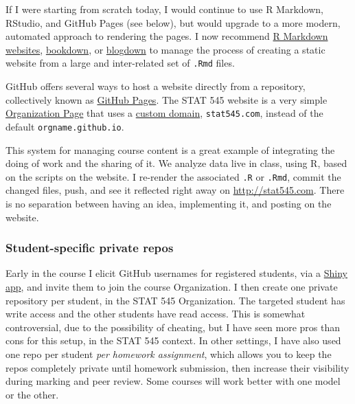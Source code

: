 \documentclass[12pt]{article}
\begin{document}
If I were starting from scratch today, I would continue to use R
Markdown, RStudio, and GitHub Pages (see below), but would upgrade to a
more modern, automated approach to rendering the pages. I now recommend
\href{http://rmarkdown.rstudio.com/rmarkdown_websites.html}{R Markdown
websites}, \href{https://bookdown.org}{bookdown}, or
\href{https://bookdown.org/yihui/blogdown/}{blogdown} to manage the
process of creating a static website from a large and inter-related set
of \texttt{.Rmd} files.

GitHub offers several ways to host a website directly from a repository,
collectively known as
\href{https://help.github.com/categories/github-pages-basics/}{GitHub
Pages}. The STAT 545 website is a very simple
\href{https://help.github.com/articles/user-organization-and-project-pages/}{Organization
Page} that uses a
\href{https://help.github.com/articles/custom-domain-redirects-for-github-pages-sites/}{custom
domain}, \texttt{stat545.com}, instead of the default
\texttt{orgname.github.io}.

This system for managing course content is a great example of
integrating the doing of work and the sharing of it. We analyze data
live in class, using R, based on the scripts on the website. I re-render
the associated \texttt{.R} or \texttt{.Rmd}, commit the changed files,
push, and see it reflected right away on \url{http://stat545.com}. There
is no separation between having an idea, implementing it, and posting on
the website.

\subsubsection{Student-specific private
repos}\label{student-specific-private-repos}

Early in the course I elicit GitHub usernames for registered students,
via a \href{https://shiny.rstudio.com}{Shiny app}, and invite them to
join the course Organization. I then create one private repository per
student, in the STAT 545 Organization. The targeted student has write
access and the other students have read access. This is somewhat
controversial, due to the possibility of cheating, but I have seen more
pros than cons for this setup, in the STAT 545 context. In other
settings, I have also used one repo per student \emph{per homework
assignment}, which allows you to keep the repos completely private until
homework submission, then increase their visibility during marking and
peer review. Some courses will work better with one model or the other.
\end{document}
